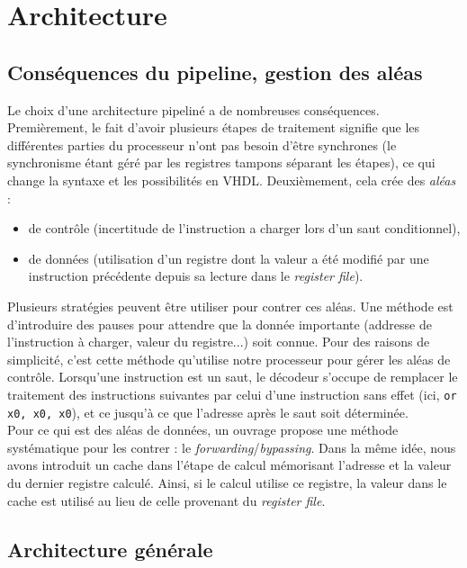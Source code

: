 \chapter{Architecture}
\label{ch:architecure}

\section{Conséquences du pipeline, gestion des aléas}
\label{sec:pipeline}

Le choix d'une architecture pipeliné\cite{pipeline} a de nombreuses
conséquences. Premièrement, le fait d'avoir plusieurs étapes de traitement
signifie que les différentes parties du processeur n'ont pas besoin d'être
synchrones (le synchronisme étant géré par les registres tampons séparant les
étapes), ce qui change la syntaxe et les possibilités en VHDL. Deuxièmement,
cela crée des \textit{aléas} :
\begin{itemize}
\item de contrôle (incertitude de l'instruction a charger lors d'un saut
    conditionnel),
\item de données (utilisation d'un registre dont la valeur a été modifié par une
    instruction précédente depuis sa lecture dans le \textit{register file}). \\
\end{itemize}

Plusieurs stratégies peuvent être utiliser pour contrer ces aléas. Une méthode
est d'introduire des pauses pour attendre que la donnée importante (addresse de
l'instruction à charger, valeur du registre...) soit connue. Pour des raisons de
simplicité, c'est cette méthode qu'utilise notre processeur pour gérer les aléas
de contrôle. Lorsqu'une instruction est un saut, le décodeur s'occupe de
remplacer le traitement des instructions suivantes par celui d'une instruction
sans effet (ici, \texttt{or x0, x0, x0}), et ce jusqu'à ce que l'adresse après
le saut soit déterminée. \\

Pour ce qui est des aléas de données, un ouvrage\cite{riscv} propose une méthode
systématique pour les contrer : le \textit{forwarding}/\textit{bypassing}. Dans
la même idée, nous avons introduit un cache dans l'étape de calcul mémorisant
l'adresse et la valeur du dernier registre calculé. Ainsi, si le calcul utilise
ce registre, la valeur dans le cache est utilisé au lieu de celle provenant du
\textit{register file}.

\section{Architecture générale}

